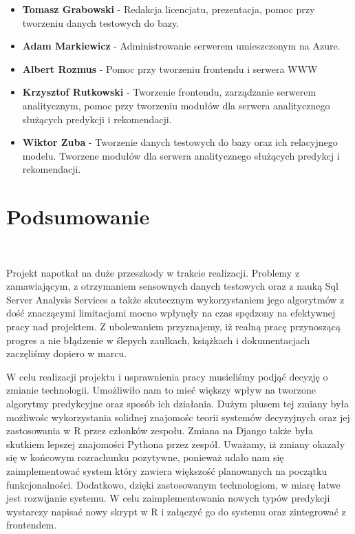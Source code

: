 \documentclass[licencjacka]{pracamgr}
\begin{document}
\begin{itemize}
\item \textbf{Tomasz Grabowski} - Redakcja licencjatu, prezentacja, pomoc przy tworzeniu danych testowych do bazy.
\item \textbf{Adam Markiewicz} - Administrowanie serwerem umieszczonym na Azure.
\item \textbf{Albert Rozmus} - Pomoc przy tworzeniu frontendu i serwera WWW
\item \textbf{Krzysztof Rutkowski} - Tworzenie frontendu, zarządzanie serwerem analitycznym, pomoc przy tworzeniu modułów dla serwera analitycznego służących predykcji i rekomendacji.
\item \textbf{Wiktor Zuba} - Tworzenie danych testowych do bazy oraz ich relacyjnego modelu. Tworzene modułów dla serwera analitycznego służących predykcj i rekomendacji.
\end{itemize}

\chapter{Podsumowanie} ~\\ \indent


Projekt napotkał na duże przeszkody w trakcie realizacji. Problemy z zamawiającym, z otrzymaniem sensownych danych testowych oraz z nauką Sql Server Analysis Services a także skutecznym wykorzystaniem jego algorytmów z dość znaczącymi limitacjami mocno wpłynęły na czas spędzony na efektywnej pracy nad projektem. Z ubolewaniem przyznajemy, iż realną pracę przynoszącą progres a nie błądzenie w ślepych zaułkach, książkach i dokumentacjach zaczęliśmy dopiero w marcu.

W celu realizacji projektu i usprawnienia pracy musieliśmy podjąć decyzję o zmianie technologii. Umożliwiło nam to mieć większy wpływ na tworzone algorytmy predykcyjne oraz sposób ich działania. Dużym plusem tej zmiany była możliwośc wykorzystania solidnej znajomośc teorii systemów decyzyjnych oraz jej zastosowania w R przez członków zespołu. Zmiana na Django także była skutkiem lepszej znajomości Pythona przez zespół. Uważamy, iż zmiany okazały się w końcowym rozrachunku pozytywne, ponieważ udało nam się zaimplementować system który zawiera większość planowanych na początku funkcjonalności. Dodatkowo, dzięki zastosowanym technologiom, w miarę łatwe jest rozwijanie systemu. W celu zaimplementowania nowych typów predykcji wystarczy napisać nowy skrypt w R i załączyć go do systemu oraz zintegrować z frontendem.
\end{document}
